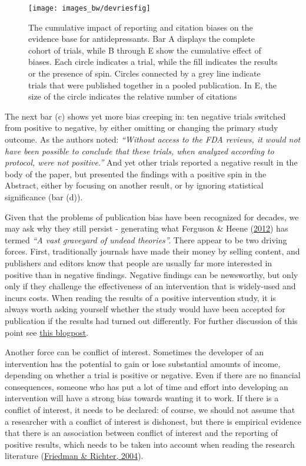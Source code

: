 \documentclass{krantz}
\begin{document}
\begin{figure}
\texttt{[image: images\_bw/devriesfig]} \caption{The cumulative impact of reporting and citation biases on the evidence base for antidepressants. Bar A displays the complete cohort of trials, while B through E show the cumulative effect of biases. Each circle indicates a trial, while the fill indicates the results or the presence of spin. Circles connected by a grey line indicate trials that were published together in a pooled publication. In E, the size of the circle indicates the relative number of citations}\label{fig:devriesfig}
\end{figure}

The next bar (c) shows yet more bias creeping in: ten negative trials switched from positive to negative, by either omitting or changing the primary study outcome. As the authors noted: \emph{``Without access to the FDA reviews, it would not have been possible to conclude that these trials, when analyzed according to protocol, were not positive.''} And yet other trials reported a negative result in the body of the paper, but presented the findings with a positive spin in the Abstract, either by focusing on another result, or by ignoring statistical significance (bar (d)).

Given that the problems of publication bias have been recognized for decades, we may ask why they still persist - generating what Ferguson \& Heene (\protect\hyperlink{ref-ferguson2012}{2012}) has termed \emph{``A vast graveyard of undead theories''.} There appear to be two driving forces. First, traditionally journals have made their money by selling content, and publishers and editors know that people are usually far more interested in positive than in negative findings. Negative findings can be newsworthy, but only only if they challenge the effectiveness of an intervention that is widely-used and incurs costs. When reading the results of a positive intervention study, it is always worth asking yourself whether the study would have been accepted for publication if the results had turned out differently. For further discussion of this point see \href{https://figshare.com/articles/preprint/High-impact_journals_where_newsworthiness_trumps_methodology/5631748}{this blogpost}.

Another force can be conflict of interest. Sometimes the developer of an intervention has the potential to gain or lose substantial amounts of income, depending on whether a trial is positive or negative. Even if there are no financial consequences, someone who has put a lot of time and effort into developing an intervention will have a strong bias towards wanting it to work. If there is a conflict of interest, it needs to be declared: of course, we should not assume that a researcher with a conflict of interest is dishonest, but there is empirical evidence that there is an association between conflict of interest and the reporting of positive results, which needs to be taken into account when reading the research literature (\protect\hyperlink{ref-friedman2004}{Friedman \& Richter, 2004}).
\end{document}
